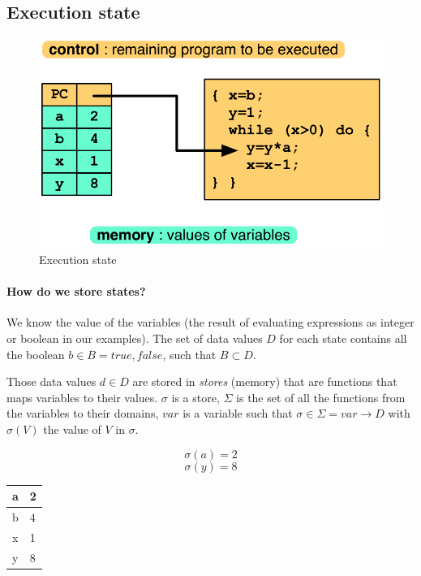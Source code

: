 \documentclass[12pt, a4paper]{book}
\begin{document}
\subsection{Execution state}
\label{sub:Execution state}

\begin{figure}[!ht]
    \centering
    \includegraphics[width=0.6\linewidth]{execution_state.png}
    \caption{Execution state}
\end{figure}

\paragraph{How do we store states?} We know the value of the variables (the
result of evaluating expressions as integer or boolean in our examples). The
set of data values $D$ for each state contains all the boolean
$b \in B = {true, false}$, such that $B \subset D$. \newline

Those data values $d \in D$ are stored in \textit{stores} (memory) that are
functions that maps variables to their values. $\sigma$ is a store, $\Sigma$ is
the set of all the functions from the variables to their domains, $var$ is a
variable such that $\sigma \in \Sigma = var \rightarrow D$ with $\sigma(V)$ the
value of $V$ in $\sigma$.

\begin{minipage}{\linewidth}
    \begin{minipage}{0.4\linewidth}
        $$\sigma(a) = 2$$
        $$\sigma(y)=8$$
    \end{minipage}
    \begin{minipage}{0.4\linewidth}
        \centering
        \begin{tabular}{ll}
            \toprule
            a & 2 \\
            \midrule
            b & 4 \\
            \midrule
            x & 1 \\
            \midrule
            y & 8 \\
            \bottomrule
        \end{tabular}
    \end{minipage}
\end{minipage}
\bigskip
\end{document}
